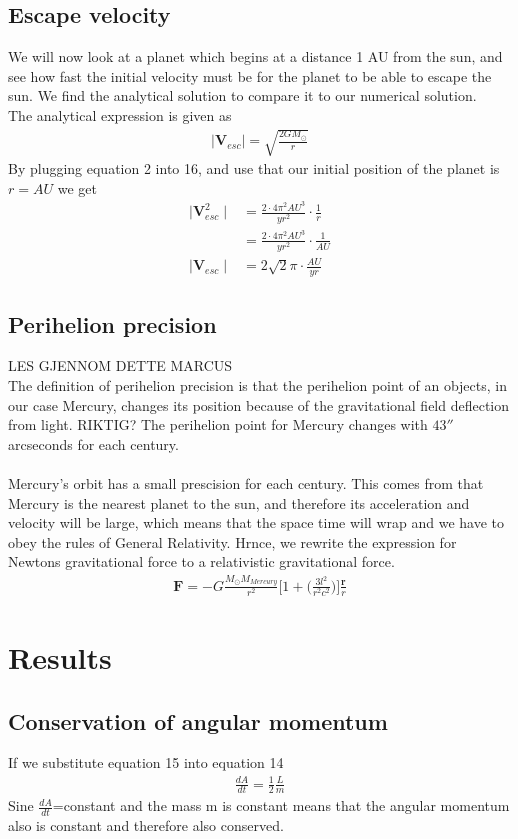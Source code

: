 \documentclass{article}
\begin{document}
\begin{multicols}{2}
\subsection{Escape velocity}
We will now look at a planet which begins at a distance 1 AU from the sun, 
and see how fast the initial velocity must be for the planet to be able to escape the sun. We find the analytical solution to compare it to our numerical solution. \\
The analytical expression is given as 
\begin{align}
    \mid{\mathbf{V}_{esc}}\mid=\sqrt{\frac{2GM_{\odot}}{r}}
\end{align}
By plugging equation 2 into 16, and use that our initial position of the planet is $r=AU$ we get
\begin{align}
\mid{\mathbf{V}_{esc}^2}\mid&=\frac{2\cdot 4\pi^2AU^3}{yr^2}\cdot\frac{1}{r}\\
&=\frac{2\cdot 4\pi^2AU^3}{yr^2}\cdot\frac{1}{AU}\\
\mid{\mathbf{V}_{esc}}\mid&=2\sqrt{2}\pi\cdot\frac{AU}{yr}
\end{align}
\subsection{Perihelion precision}
LES GJENNOM DETTE MARCUS\\
The definition of perihelion precision is that the perihelion point of an objects, in our case Mercury, changes its position because of 
the gravitational field deflection from light. RIKTIG? The perihelion point for Mercury changes with $43''$ arcseconds for each century. \\
\\
Mercury's orbit has a small prescision for each century. This comes from that Mercury is the nearest planet to the sun, and therefore its acceleration and velocity will be large, which means that the space time will wrap    and we have to obey the rules of General Relativity. Hrnce, we rewrite the expression for Newtons gravitational force to a relativistic gravitational force.
\begin{align}
    \mathbf{F}=-G\frac{M_{\odot}M_{Mercury}}{r^2}\Bigg[1+\Bigg(\frac{3l^2}{r^2c^2}\bigg)\bigg]\frac{\mathbf{r}}{r}
\end{align}

\section{Results}
\subsection{Conservation of angular momentum}
If we substitute equation 15 into equation 14 
\begin{align}
    \frac{dA}{dt}=\frac{1}{2}\frac{L}{m}
\end{align}
Sine $\frac{dA}{dt}$=constant and the mass m is constant means that the angular momentum also is constant and therefore also conserved.  
\\
\\
\\
\\

\end{multicols}
\end{document}
